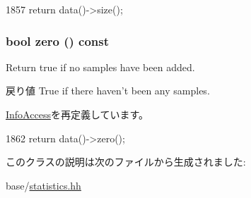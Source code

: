 \begin{DoxyCode}
1857 { return data()->size(); }
\end{DoxyCode}
\hypertarget{classStats_1_1DistBase_a4e72b01b727d3165e75cba84eb507491}{
\subsubsection[{zero}]{\setlength{\rightskip}{0pt plus 5cm}bool zero () const}}
\label{classStats_1_1DistBase_a4e72b01b727d3165e75cba84eb507491}
Return true if no samples have been added. \begin{DoxyReturn}{戻り値}
True if there haven't been any samples. 
\end{DoxyReturn}


\hyperlink{classStats_1_1InfoAccess_a4e72b01b727d3165e75cba84eb507491}{InfoAccess}を再定義しています。


\begin{DoxyCode}
1862 { return data()->zero(); }
\end{DoxyCode}


このクラスの説明は次のファイルから生成されました:\begin{DoxyCompactItemize}
\item 
base/\hyperlink{statistics_8hh}{statistics.hh}\end{DoxyCompactItemize}
